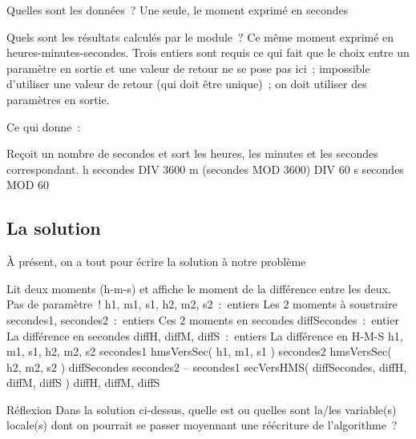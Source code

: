 		\begin{liste}
		\item
			Quelles sont les données~? Une seule, le moment exprimé en secondes
		\item
			Quels sont les résultats calculés par le module~? 
			Ce même moment exprimé en heures-minutes-secondes. 
			Trois entiers sont requis ce qui fait que le choix 
			entre un paramètre en sortie et une valeur de retour ne se
			pose pas ici~; 
			impossible d’utiliser une valeur de retour 
			(qui doit être unique)~; 
			on doit utiliser des paramètres en sortie.
		\end{liste}
	
		Ce qui donne~:
	
		\begin{Pseudocode}
			\LComment Reçoit un nombre de secondes et sort les heures, 
				les minutes et les secondes correspondant.
				\Let h \Gets secondes DIV 3600
				\Let m \Gets (secondes MOD 3600) DIV 60
				\Let s \Gets secondes MOD 60
			\EndModule
		\end{Pseudocode}
	
	\subsection{La solution}
	
		À présent, on a tout pour écrire la solution à notre problème
	
		\begin{Pseudocode}
			\LComment Lit deux moments (h-m-s) et affiche le moment de la différence entre les deux.
			 \RComment Pas de paramètre~!
				\Decl h1, m1, s1, h2, m2, s2~:~entiers \RComment Les 2 moments à soustraire
				\Decl secondes1, secondes2~:~entiers \RComment Ces 2 moments en secondes
				\Decl diffSecondes~:~entier \RComment La différence en secondes
				\Decl diffH, diffM, diffS~:~entiers \RComment La différence en H-M-S
				\Read h1, m1, s1, h2, m2, s2
				\Let secondes1 \Gets hmsVersSec( h1, m1, s1 )
				\Let secondes2 \Gets hmsVersSec( h2, m2, s2 )
				\Let diffSecondes \Gets secondes2 – secondes1
				\Stmt secVersHMS( diffSecondes, diffH, diffM, diffS )
				\Write diffH, diffM, diffS
			\EndModule
		\end{Pseudocode}
	
		
		\begin{Emphase}[reflexion]{Réflexion}
			Dans la solution ci-dessus, 
			quelle est ou quelles sont la/les variable(s) locale(s) 
			dont on pourrait se passer moyennant une réécriture de
			l’algorithme~?
		\end{Emphase}
	

